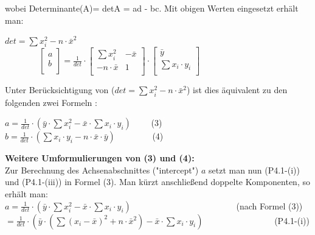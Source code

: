 \documentclass[12pt]{article}
\begin{document}
wobei Determinante(A)= detA = ad - bc. Mit obigen Werten eingesetzt erhält man: \\
\begin{center}
\begin{large}
$ det = \sum{x_i^2} - n \cdot \bar{x}^2 $ \\[0.5cm]        
$ \qquad\qquad  \begin{bmatrix} a \\ b \\ \end{bmatrix} = \frac{1}{det} \cdot { \begin{bmatrix} \sum{x_i^2} & -\bar{x} \\ -n \cdot \bar{x} & 1 \\ \end{bmatrix} \cdot                                                                                                     \begin{bmatrix} \bar{y} \\ \sum{x_i \cdot y_i} \\ \end{bmatrix}} $ \\[0.8cm]
\end{large}
\end{center} 
Unter Berücksichtigung von ($ det = \sum{x_i^2} - n \cdot \bar{x}^2 $) ist dies äquivalent zu den folgenden zwei Formeln : \\
\begin{center}
\begin{Large}
$ a = \frac{1}{det} \cdot (\bar{y} \cdot \sum{x_i^2} - \bar{x} \cdot \sum{x_i \cdot y_i})\qquad $ (3) \\[0.5cm]
$ b = \frac{1}{det} \cdot (\sum {x_i \cdot y_i} - n \cdot \bar{x} \cdot \bar{y})\qquad\qquad $      (4) \\[0.5cm]
\end{Large}
\end{center} 
\textbf{Weitere Umformulierungen von (3) und (4):}\\[0.1cm]
%
Zur Berechnung des Achsenabschnittes ("intercept") $a$ setzt man nun (P4.1-(i)) und (P4.1-(iii)) in Formel (3). Man kürzt anschließend doppelte Komponenten, so erhält  man: \\[0.2cm]
$ a = \frac{1}{det} \cdot (\bar{y} \cdot \sum{x_i^2} - \bar{x} \cdot \sum{x_i \cdot y_i})\qquad \qquad \qquad \qquad \qquad \qquad $      (nach Formel (3))
\\[0.2cm]
$ = \frac{1}{det} \cdot (\bar{y} \cdot (\sum{(x_i - \bar{x})^2} + n \cdot \bar{x}^2) - \bar{x} \cdot \sum{x_i \cdot y_i})\qquad \qquad \qquad \qquad $ (P4.1-(i)) \\[0.2cm]
\end{document}
